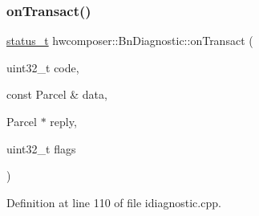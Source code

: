 \subsubsection{\texorpdfstring{on\+Transact()}{onTransact()}}
{\footnotesize\ttfamily \mbox{\hyperlink{hwcserviceapi_8h_a3806fb2027d9a316d8ca8d9b8b8eb96f}{status\+\_\+t}} hwcomposer\+::\+Bn\+Diagnostic\+::on\+Transact (\begin{DoxyParamCaption}\item[{uint32\+\_\+t}]{code,  }\item[{const Parcel \&}]{data,  }\item[{Parcel $\ast$}]{reply,  }\item[{uint32\+\_\+t}]{flags }\end{DoxyParamCaption})\hspace{0.3cm}{\ttfamily [override]}}



Definition at line 110 of file idiagnostic.\+cpp.


